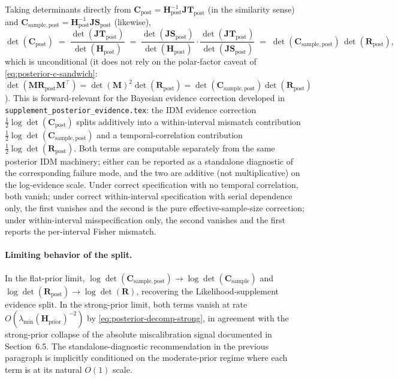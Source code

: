 \documentclass[11pt]{article}
\begin{document}
Taking determinants directly from $\mathbf C_{\mathrm{post}} = \mathbf H_{\mathrm{post}}^{-1} \mathbf{JT}_{\mathrm{post}}$ (in the similarity sense) and $\mathbf C_{\mathrm{sample},\mathrm{post}} = \mathbf H_{\mathrm{post}}^{-1} \mathbf{JS}_{\mathrm{post}}$ (likewise),
\begin{equation}
\det(\mathbf C_{\mathrm{post}})
\;=\;
\frac{\det(\mathbf{JT}_{\mathrm{post}})}{\det(\mathbf H_{\mathrm{post}})}
\;=\;
\frac{\det(\mathbf{JS}_{\mathrm{post}})}{\det(\mathbf H_{\mathrm{post}})}
\cdot
\frac{\det(\mathbf{JT}_{\mathrm{post}})}{\det(\mathbf{JS}_{\mathrm{post}})}
\;=\;
\det(\mathbf C_{\mathrm{sample},\mathrm{post}})\,
\det(\mathbf R_{\mathrm{post}}),
\label{eq:posterior-det-split}
\end{equation}
which is unconditional (it does not rely on the polar-factor caveat of \eqref{eq:posterior-c-sandwich}: $\det(\mathbf M \mathbf R_{\mathrm{post}} \mathbf M^\top) = \det(\mathbf M)^2 \det(\mathbf R_{\mathrm{post}}) = \det(\mathbf C_{\mathrm{sample},\mathrm{post}}) \det(\mathbf R_{\mathrm{post}})$). This is forward-relevant for the Bayesian evidence correction developed in \texttt{supplement\_posterior\_evidence.tex}: the IDM evidence correction $\tfrac{1}{2}\log\det(\mathbf C_{\mathrm{post}})$ splits additively into a within-interval mismatch contribution $\tfrac{1}{2}\log\det(\mathbf C_{\mathrm{sample},\mathrm{post}})$ and a temporal-correlation contribution $\tfrac{1}{2}\log\det(\mathbf R_{\mathrm{post}})$. Both terms are computable separately from the same posterior IDM machinery; either can be reported as a standalone diagnostic of the corresponding failure mode, and the two are additive (not multiplicative) on the log-evidence scale. Under correct specification with no temporal correlation, both vanish; under correct within-interval specification with serial dependence only, the first vanishes and the second is the pure effective-sample-size correction; under within-interval misspecification only, the second vanishes and the first reports the per-interval Fisher mismatch.

\paragraph{Limiting behavior of the split.}
In the flat-prior limit, $\log\det(\mathbf C_{\mathrm{sample},\mathrm{post}}) \to \log\det(\mathbf C_{\mathrm{sample}})$ and $\log\det(\mathbf R_{\mathrm{post}}) \to \log\det(\mathbf R)$, recovering the Likelihood-supplement evidence split. In the strong-prior limit, both terms vanish at rate $O(\lambda_{\min}(\mathbf H_{\mathrm{prior}})^{-2})$ by \eqref{eq:posterior-decomp-strong}, in agreement with the strong-prior collapse of the absolute miscalibration signal documented in Section~6.5. The standalone-diagnostic recommendation in the previous paragraph is implicitly conditioned on the moderate-prior regime where each term is at its natural $O(1)$ scale.
\end{document}
